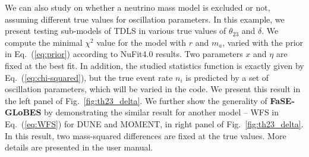 \documentclass[aps,prd,nofootinbib,preprint]{revtex4}
\begin{document}
We can also study on whether a neutrino mass model is excluded or not, assuming different true values for oscillation parameters. In this example, we present testing sub-models of TDLS in various true values of $\theta_{23}$ and $\delta$. We compute the minimal $\chi^2$ value for the model with $r$ and $m_a$, varied with the prior in Eq.~(\ref{eq:prior}) according to NuFit4.0 results. Two parameters $x$ and $\eta$ are fixed at the best fit. In addition, the studied statistics function is exactly given by Eq.~(\ref{eq:chi-squared}), but the true event rate $n_i$ is predicted by a set of oscillation parameters, which will be varied in the code. 
%
We present this result in the left panel of Fig.~\ref{fig:th23_delta}. We further show the generality of \textbf{FaSE-GLoBES} by demonstrating the similar result for another model -- WFS in Eq.~(\ref{eq:WFS}) for DUNE and MOMENT, in right panel of Fig.~\ref{fig:th23_delta}. In this result, two mass-squared differences are fixed at the true values. 
%
%
More details are presented in the user manual. 
\end{document}
